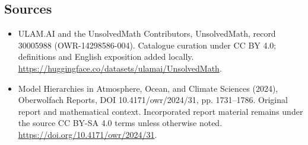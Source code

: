 \documentclass[11pt]{article}
\begin{document}
\subsection{Sources}
\begin{itemize}
\item[\hypertarget{source:30005988:1}{S1}] ULAM.AI and the UnsolvedMath Contributors, UnsolvedMath, record 30005988 (OWR-14298586-004). Catalogue curation under CC BY 4.0; definitions and English exposition added locally.
\url{https://huggingface.co/datasets/ulamai/UnsolvedMath}.
\item[\hypertarget{source:30005988:2}{S2}] Model Hierarchies in Atmosphere, Ocean, and Climate Sciences (2024), Oberwolfach Reports, DOI 10.4171/owr/2024/31, pp. 1731--1786. Original report and mathematical context. Incorporated report material remains under the source CC BY-SA 4.0 terms unless otherwise noted.
\url{https://doi.org/10.4171/owr/2024/31}.
\end{itemize}
\label{end:30005988}
\end{document}
